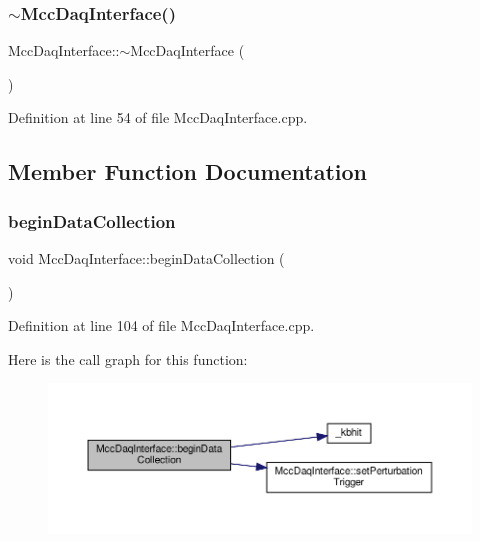 \subsubsection{\texorpdfstring{$\sim$\+Mcc\+Daq\+Interface()}{~MccDaqInterface()}}
{\footnotesize\ttfamily Mcc\+Daq\+Interface\+::$\sim$\+Mcc\+Daq\+Interface (\begin{DoxyParamCaption}{ }\end{DoxyParamCaption})}



Definition at line 54 of file Mcc\+Daq\+Interface.\+cpp.



\subsection{Member Function Documentation}
\mbox{\label{class_mcc_daq_interface_a5b50adc88a30d405b491cd50926d28ba}} 
\subsubsection{\texorpdfstring{begin\+Data\+Collection}{beginDataCollection}}
{\footnotesize\ttfamily void Mcc\+Daq\+Interface\+::begin\+Data\+Collection (\begin{DoxyParamCaption}{ }\end{DoxyParamCaption})\hspace{0.3cm}{\ttfamily [slot]}}



Definition at line 104 of file Mcc\+Daq\+Interface.\+cpp.

Here is the call graph for this function\+:
\nopagebreak
\begin{figure}[H]
\begin{center}
\leavevmode
\includegraphics[width=350pt]{class_mcc_daq_interface_a5b50adc88a30d405b491cd50926d28ba_cgraph}
\end{center}
\end{figure}
\mbox{\label{class_mcc_daq_interface_a45d83d2cf73a5375b7d477e18b672da4}} 
